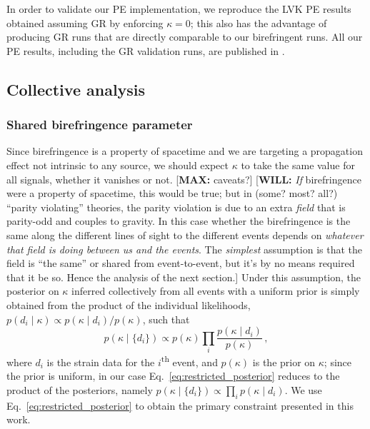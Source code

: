 \documentclass[aps,prd,twocolumn,superscriptaddress,preprintnumbers,floatfix,nofootinbib]{revtex4-2}
\newcommand*{\mi}[1]{\textsf{\color{magenta} [\textbf{MAX:} #1]}}
\newcommand*{\wf}[1]{\textsf{\color{cyan} [\textbf{WILL:} #1]}}
\begin{document}
In order to validate our \ac{PE} implementation, we reproduce the \ac{LVK} \ac{PE} results obtained assuming \ac{GR} by enforcing $\kappa = 0$; this also has the advantage of producing \ac{GR} runs that are directly comparable to our birefringent runs.
All our \ac{PE} results, including the \ac{GR} validation runs, are published in \citet{dataset}.

\subsection{Collective analysis}

\subsubsection{Shared birefringence parameter}

Since birefringence is a property of spacetime and we are targeting a
propagation effect not intrinsic to any source, we should expect $\kappa$ to
take the same value for all signals, whether it vanishes or not. \mi{caveats?}
\wf{\emph{If} birefringence were a property of spacetime, this would be true;
but in (some? most? all?) ``parity violating'' theories, the parity violation is
due to an extra \emph{field} that is parity-odd and couples to gravity.  In this
case whether the birefringence is the same along the different lines of sight to
the different events depends on \emph{whatever that field is doing between us
and the events}.  The \emph{simplest} assumption is that the field is ``the
same'' or shared from event-to-event, but it's by no means required that it be
so.  Hence the analysis of the next section.} Under this assumption, the
posterior on $\kappa$ inferred collectively from all events with a uniform prior
is simply obtained from the product of the individual likelihoods, $p(d_i \mid
\kappa) \propto p(\kappa \mid d_i)/p(\kappa)$, such that
\begin{equation}
    p(\kappa \mid \{d_i\})\propto p(\kappa) \prod_{i}\frac{p(\kappa \mid d_i)}{p(\kappa)}\,,
    \label{eq:restricted_posterior}
\end{equation}
where $d_i$ is the strain data for the $i$\textsuperscript{th} event, and $p(\kappa)$ is the prior on $\kappa$; since the prior is uniform, in our case Eq.~\eqref{eq:restricted_posterior} reduces to the product of the posteriors, namely $p(\kappa \mid \{d_i\}) \propto \prod_{i}p(\kappa \mid d_i)$.
We use Eq.~\eqref{eq:restricted_posterior} to obtain the primary constraint presented in this work.
\end{document}
